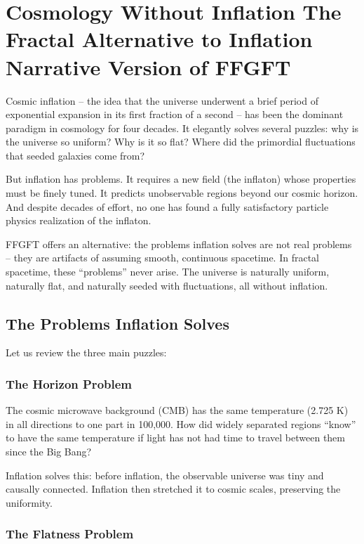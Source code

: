 \chapter{Cosmology Without Inflation  The Fractal Alternative to Inflation  Narrative Version of FFGFT}



Cosmic inflation -- the idea that the universe underwent a brief period of exponential expansion in its first fraction of a second -- has been the dominant paradigm in cosmology for four decades. It elegantly solves several puzzles: why is the universe so uniform? Why is it so flat? Where did the primordial fluctuations that seeded galaxies come from?

But inflation has problems. It requires a new field (the inflaton) whose properties must be finely tuned. It predicts unobservable regions beyond our cosmic horizon. And despite decades of effort, no one has found a fully satisfactory particle physics realization of the inflaton.

FFGFT offers an alternative: the problems inflation solves are not real problems -- they are artifacts of assuming smooth, continuous spacetime. In fractal spacetime, these ``problems'' never arise. The universe is naturally uniform, naturally flat, and naturally seeded with fluctuations, all without inflation.

\section{The Problems Inflation Solves}

Let us review the three main puzzles:

\subsection{The Horizon Problem}

The cosmic microwave background (CMB) has the same temperature (2.725 K) in all directions to one part in 100,000. How did widely separated regions ``know'' to have the same temperature if light has not had time to travel between them since the Big Bang?

Inflation solves this: before inflation, the observable universe was tiny and causally connected. Inflation then stretched it to cosmic scales, preserving the uniformity.

\subsection{The Flatness Problem}

